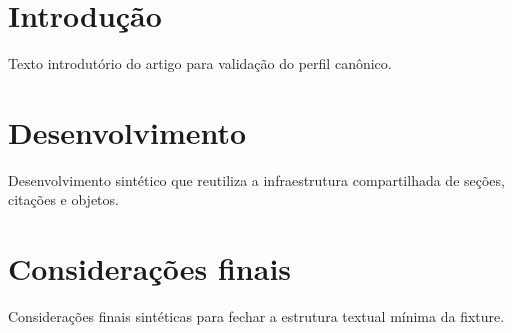 \documentclass{abntexto-ufc}
\begin{document}
\pretextual
{}

\textual
\section{Introdução}
Texto introdutório do artigo para validação do perfil canônico.

\section{Desenvolvimento}
Desenvolvimento sintético que reutiliza a infraestrutura compartilhada de seções, citações e objetos.

\section{Considerações finais}
Considerações finais sintéticas para fechar a estrutura textual mínima da fixture.

\nocite{silva2020}
\ufcPrintReferences
\end{document}
